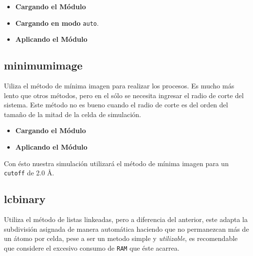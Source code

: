 \begin{itemize}
 \item \textbf{Cargando el M\'odulo}
 \item \textbf{Cargando en modo} \texttt{auto}.
 \item \textbf{Aplicando el M\'odulo}
\end{itemize}

\subsection{minimumimage}
Uiliza el m\'etodo de m\'inima imagen para realizar los procesos. Es mucho m\'as lento que otros m\'etodos, pero en el s\'olo se necesita ingresar el radio de corte del sistema. Este m\'etodo no es bueno cuando el radio de corte es del orden del tama\~no de la mitad de la celda de simulaci\'on.

\begin{itemize}
 \item \textbf{Cargando el M\'odulo}
 \item \textbf{Aplicando el M\'odulo}
\end{itemize}

Con \'esto nuestra simulaci\'on utilizar\'a el m\'etodo de m\'inima imagen para un \verb|cutoff| de 2.0 \AA.

\subsection{lcbinary}
Utiliza el m\'etodo de listas linkeadas, pero a diferencia del anterior, este adapta la subdivisi\'on asignada de manera autom\'atica haciendo que no permanezcan m\'as de un \'atomo por celda, pese a ser un metodo simple y \textit{utilizable}, es recomendable que considere el excesivo consumo de \verb|RAM| que \'este acarrea.

